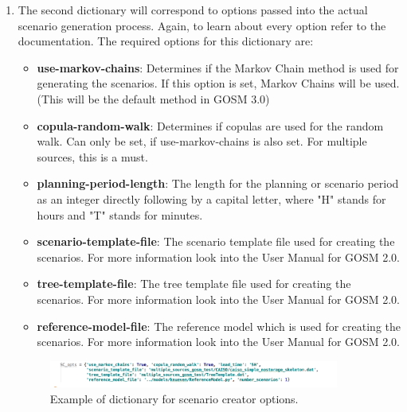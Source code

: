 \documentclass{article}
\begin{document}
\begin{enumerate}
\item The second dictionary will correspond to options passed into the actual scenario generation process. Again, to learn about every option refer to the documentation. The required options for this dictionary are:
\begin{itemize}
	\item \textbf{use-markov-chains}: Determines if the Markov Chain method is used for generating the scenarios. If this option is set, Markov Chains will be used. (This will be the default method in GOSM 3.0)
	\item \textbf{copula-random-walk}: Determines if copulas are used for the random walk. Can only be set, if use-markov-chains is also set. For multiple sources, this is a must.
	\item \textbf{planning-period-length}: The length for the planning or scenario period as an integer directly following by a capital letter, where "H" stands for hours and "T" stands for minutes.
	\item \textbf{scenario-template-file}: The scenario template file  used for creating the scenarios. For more information look into the User Manual for GOSM 2.0.
	\item \textbf{tree-template-file}: The tree template file used for creating the scenarios. For more information look into the User Manual for GOSM 2.0.
	\item \textbf{reference-model-file}: The reference model which is used for creating the scenarios. For more information look into the User Manual for GOSM 2.0.
\end{itemize}
\begin{figure}[H]
	\centering
	\includegraphics[width=0.9\textwidth]{scenario_creator_opts.png}
	\caption{Example of dictionary for scenario creator options.}
\end{figure}


\end{enumerate}
\end{document}
